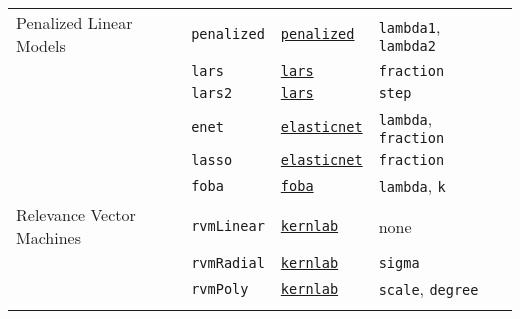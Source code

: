 \documentclass[12pt]{article}
\begin{document}
\begin{landscape}
\begin{longtable}{lllll}
\rowcolor[rgb]{.95, .95, .95}               
      Penalized Linear Models  &
         \texttt{penalized} & 
             {\tt \href{http://cran.r-project.org/web/packages/penalized/index.html}{penalized}}      & 
            \texttt{lambda1}, \texttt{lambda2} \\            
\rowcolor[rgb]{.95, .95, .95}          
       &
         \texttt{lars} & 
             {\tt \href{http://cran.r-project.org/web/packages/lars/index.html}{lars}}      & 
            \texttt{fraction} \\   
\rowcolor[rgb]{.95, .95, .95}               
         &
         \texttt{lars2} & 
             {\tt \href{http://cran.r-project.org/web/packages/lars/index.html}{lars}}        & 
            \texttt{step} \\            
\rowcolor[rgb]{.95, .95, .95}                   
      &
         \texttt{enet} & 
             {\tt \href{http://cran.r-project.org/web/packages/elasticnet/index.html}{elasticnet}}      & 
            \texttt{lambda}, \texttt{fraction} \\          
\rowcolor[rgb]{.95, .95, .95}   
      &
         \texttt{lasso} & 
             {\tt \href{http://cran.r-project.org/web/packages/elasticnet/index.html}{elasticnet}}      & 
            \texttt{fraction} \\       
\rowcolor[rgb]{.95, .95, .95}         
       &
         \texttt{foba} & 
             {\tt \href{http://cran.r-project.org/web/packages/foba/index.html}{foba}}       & 
            \texttt{lambda}, \texttt{k} \\    
                              
      Relevance Vector Machines  &
         \texttt{rvmLinear} & 
             {\tt \href{http://cran.r-project.org/web/packages/kernlab/index.html}{kernlab}}        & 
            none \\            
             
  &
         \texttt{rvmRadial} & 
            {\tt \href{http://cran.r-project.org/web/packages/kernlab/index.html}{kernlab}}       & 
            \texttt{sigma} \\              
           
  &
         \texttt{rvmPoly} & 
            {\tt \href{http://cran.r-project.org/web/packages/kernlab/index.html}{kernlab}}       & 
            \texttt{scale}, \texttt{degree} \\                        

\rowcolor[rgb]{.95, .95, .95}
            

\end{longtable}
\end{landscape}
\end{document}
